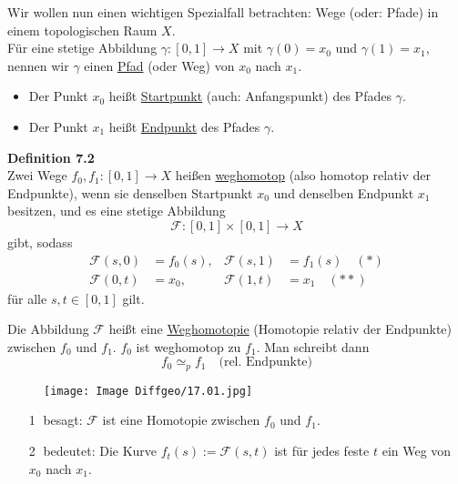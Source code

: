 \documentclass[fleqn, 12pt, letterpaper]{article}
\begin{document}
\vspace{1em}

Wir wollen nun einen wichtigen {Spezialfall} betrachten: Wege (oder: Pfade) in einem topologischen Raum \( X \).\\

Für eine stetige Abbildung
\(
\gamma : [0,1] \to X
\)
mit \( \gamma(0) = x_0 \) und \( \gamma(1) = x_1 \), nennen wir \( \gamma \) einen \underline{Pfad} (oder Weg) von \( x_0 \) nach \( x_1 \).

\begin{itemize}
  \item Der Punkt \( x_0 \) heißt \underline{Startpunkt} (auch: Anfangspunkt) des Pfades \( \gamma \).
  \item Der Punkt \( x_1 \) heißt \underline{Endpunkt} des Pfades \( \gamma \).
\end{itemize}

\vspace{0.5cm}

\textbf{Definition 7.2} \\
Zwei Wege \( f_0, f_1 : [0,1] \to X \) heißen \underline{weghomotop} (also homotop relativ der Endpunkte), wenn sie denselben Startpunkt \( x_0 \) und denselben Endpunkt \( x_1 \) besitzen, und es eine stetige Abbildung
\[
\mathcal{F} : [0,1] \times [0,1] \to X
\]
gibt, sodass
\begin{align*}
\mathcal{F}(s, 0) &= f_0(s), & \mathcal{F}(s, 1) &= f_1(s)  \quad (*)\\
\mathcal{F}(0, t) &= x_0,   & \mathcal{F}(1, t) &= x_1 \quad (**)
\end{align*}
für alle \( s, t \in [0,1] \) gilt.

Die Abbildung \( \mathcal{F} \) heißt eine \underline{Weghomotopie} (Homotopie relativ der Endpunkte) zwischen \( f_0 \) und \( f_1 \). \( f_0 \) ist weghomotop zu \( f_1 \). Man schreibt dann
\[
f_0 \simeq_p f_1 \quad \text{(rel. Endpunkte)}
\]

  \begin{figure}[H]
    \centering
    \texttt{[image: Image Diffgeo/17.01.jpg]}
 \end{figure}

\begin{itemize}
  \item[\textcircled{1}] besagt: \( \mathcal{F} \) ist eine Homotopie zwischen \( f_0 \) und \( f_1 \).
  \item[\textcircled{2}] bedeutet: Die Kurve \( f_t(s) := \mathcal{F}(s,t) \) ist für jedes feste \( t \) ein Weg von \( x_0 \) nach \( x_1 \).
\end{itemize}
\end{document}
